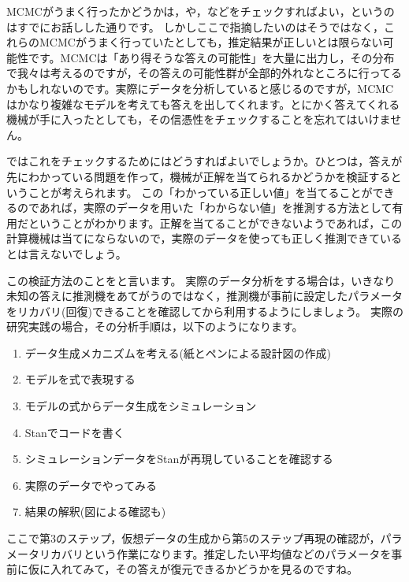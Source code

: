 \documentclass{ltjsbook}
\begin{document}
MCMCがうまく行ったかどうかは，や，などをチェックすればよい，というのはすでにお話しした通りです。
しかしここで指摘したいのはそうではなく，これらのMCMCがうまく行っていたとしても，推定結果が正しいとは限らない可能性です。MCMCは「あり得そうな答えの可能性」を大量に出力し，その分布で我々は考えるのですが，その答えの可能性群が全部的外れなところに行ってるかもしれないのです。実際にデータを分析していると感じるのですが，MCMCはかなり複雑なモデルを考えても答えを出してくれます。とにかく答えてくれる機械が手に入ったとしても，その信憑性をチェックすることを忘れてはいけません。

ではこれをチェックするためにはどうすればよいでしょうか。ひとつは，答えが先にわかっている問題を作って，機械が正解を当てられるかどうかを検証するということが考えられます。
この「わかっている正しい値」を当てることができるのであれば，実際のデータを用いた「わからない値」を推測する方法として有用だということがわかります。正解を当てることができないようであれば，この計算機械は当てにならないので，実際のデータを使っても正しく推測できているとは言えないでしょう。

この検証方法のことをと言います。
実際のデータ分析をする場合は，いきなり未知の答えに推測機をあてがうのではなく，推測機が事前に設定したパラメータをリカバリ(回復)できることを確認してから利用するようにしましょう。
実際の研究実践の場合，その分析手順は，以下のようになります。
\begin{enumerate}
	\item データ生成メカニズムを考える(紙とペンによる設計図の作成)
	\item モデルを式で表現する
	\item モデルの式からデータ生成をシミュレーション
	\item Stanでコードを書く
	\item シミュレーションデータをStanが再現していることを確認する
	\item 実際のデータでやってみる
	\item 結果の解釈(図による確認も)
\end{enumerate}
ここで第3のステップ，仮想データの生成から第5のステップ再現の確認が，パラメータリカバリという作業になります。推定したい平均値などのパラメータを事前に仮に入れてみて，その答えが復元できるかどうかを見るのですね。
\end{document}
